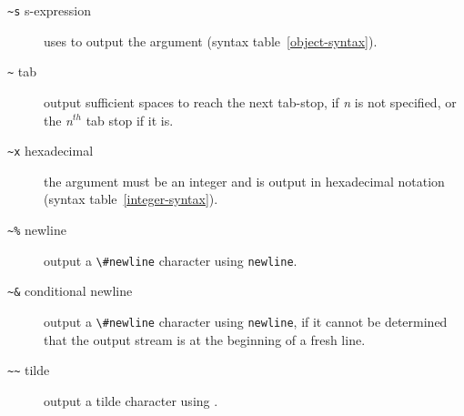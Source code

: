 \begin{optDefinition}
\begin{description}
    \item[{\tt\textasciitilde s} s-expression]%
    uses  to output the argument (syntax
    table~\ref{object-syntax}).

    \item[{\tt\textasciitilde}\true\/ tab]%
    output sufficient spaces to reach the next tab-stop, if {\em n\/} is not
    specified, or the {\em n$^{th}$} tab stop if it is.

    \item[{\tt\textasciitilde x} hexadecimal]%
    the argument must be an integer and is output in hexadecimal notation
    (syntax table~\ref{integer-syntax}).

    \item[{\tt\textasciitilde \%} newline]%
    output a \verb+\#newline+ character using {\tt newline}.

    \item[{\tt\textasciitilde \&} conditional newline]%
    output a \verb+\#newline+ character using {\tt newline}, if it cannot be
    determined that the output stream is at the beginning of a fresh line.

    \item[{\tt\textasciitilde \textasciitilde} tilde]%
    output a tilde character using .
\end{description}
%
\end{optDefinition}
